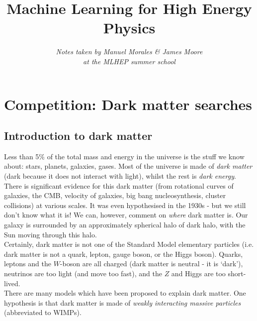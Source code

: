 



\title{\textbf{Machine Learning for High Energy Physics}}
\date{}
\author{\textit{Notes taken by Manuel Morales \& James Moore}\\ \textit{at the MLHEP summer school}}
\maketitle

\renewcommand*\contentsname{}
\tableofcontents


\newpage
\section{Competition: Dark matter searches}

\subsection{Introduction to dark matter}
Less than 5\% of the total mass and energy in the universe is the stuff we know about: stars, planets, galaxies, gases. Most of the universe is made of \textit{dark matter} (dark because it does not interact with light), whilst the rest is \textit{dark energy}.\\

There is significant evidence for this dark matter (from rotational curves of galaxies, the CMB, velocity of galaxies, big bang nucleosynthesis, cluster collisions) at various scales. It was even hypothesised in the 1930s - but we still don't know what it is! We can, however, comment on \textit{where} dark matter is. Our galaxy is surrounded by an approximately spherical halo of dark halo, with the Sun moving through this halo.\\

Certainly, dark matter is not one of the Standard Model elementary particles (i.e. dark matter is not a quark, lepton, gauge boson, or the Higgs boson). Quarks, leptons and the $W$-boson are all charged (dark matter is neutral - it is `dark'), neutrinos are too light (and move too fast), and the $Z$ and Higgs are too short-lived.\\

There are many models which have been proposed to explain dark matter. One hypothesis is that dark matter is made of \textit{weakly interacting massive particles} (abbreviated to WIMPs).

